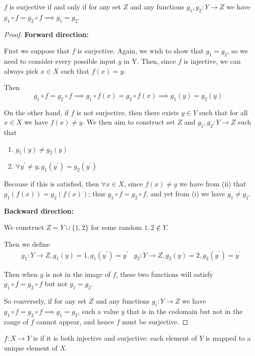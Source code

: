 \begin{proposition}
$f$ is surjective if and only if for any set $Z$ and any functions $g_1,g_2:Y\to Z$ we have $g_1 \circ f=g_2 \circ f \implies g_1=g_2$.
\end{proposition}
\begin{proof}
\textbf{Forward direction:}

First we suppose that $f$ is surjective. Again, we wish to show that $g_1=g_2$, so we need to consider every possible input $y$ in Y. Then, since $f$ is injective, we can always pick $x \in X$ such that $f(x)=y$.

Then
\[ g_1 \circ f=g_2 \circ f \implies g_1 \circ f(x)=g_2 \circ f(x) \implies g_1(y)=g_2(y) \]

On the other hand, if $f$ is not surjective, then there exists $y \in Y$ such that for all $x \in X$ we have $f(x)\neq y$. We then aim to construct set $Z$ and $g_1,g_2:Y\to Z$ such that
\begin{enumerate}[label=(\roman*)]
\item $g_1(y) \neq g_2(y)$
\item $\forall y^\prime \neq y, g_1(y^\prime)=g_2(y^\prime)$
\end{enumerate}

Because if this is satisfied, then $\forall x \in X$, since $f(x)\neq y$ we have from (ii) that $g_1(f(x))=g_2(f(x))$; thus $g_1 \circ f=g_2 \circ f$, and yet from (i) we have $g_1 \neq g_2$.

\textbf{Backward direction:}

We construct $Z=Y\cup\{1,2\}$ for some random $1,2 \notin Y$.

Then we define
\begin{align*}
&g_1:Y\to Z,g_1(y)=1,g_1(y^\prime)=y^\prime
&g_2:Y\to Z,g_2(y)=2,g_2(y^\prime)=y^\prime
\end{align*}

Then when $y$ is not in the image of $f$, these two functions will satisfy $g_1 \circ f=g_2 \circ f$ but not $g_1=g_2$.

So conversely, if for any set $Z$ and any functions $g_i:Y \to Z$ we have $g_1 \circ f=g_2 \circ f \implies g_1=g_2$, such a value $y$ that is in the codomain but not in the range of $f$ cannot appear, and hence $f$ must be surjective.
\end{proof}

\begin{definition}
$f:X\to Y$ is  if it is both injective and surjective: each element of $Y$ is mapped to a unique element of $X$.
\end{definition}
\pagebreak

